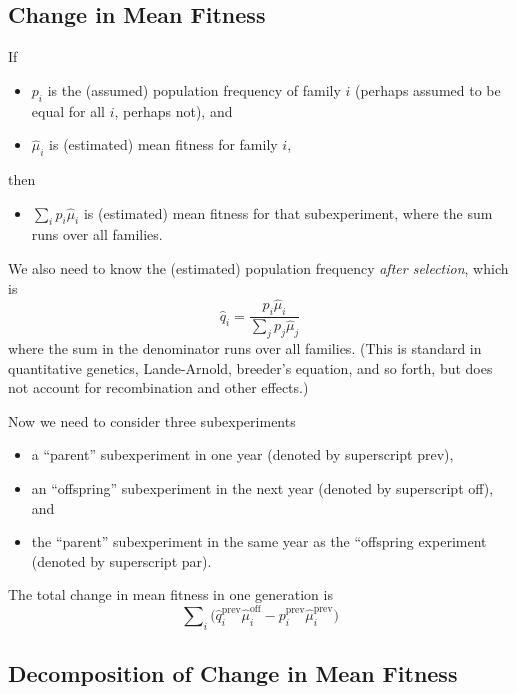 \documentclass[11pt]{article}
\begin{document}
\subsection{Change in Mean Fitness}

If
\begin{itemize}
\item $p_i$ is the (assumed) population frequency of family $i$ (perhaps
    assumed to be equal for all $i$, perhaps not), and
\item $\hat{\mu}_i$ is (estimated) mean fitness for family $i$,
\end{itemize}
then
\begin{itemize}
\item $\sum_i p_i \hat{\mu}_i$ is (estimated) mean fitness for
that subexperiment, where the sum runs over all families.
\end{itemize}

We also need to know the (estimated) population frequency
\emph{after selection}, which is
$$
   \hat{q}_i = \frac{p_i \hat{\mu}_i}{\sum_j p_j \hat{\mu}_j}
$$
where the sum in the denominator runs over all families.
(This is standard in quantitative genetics, Lande-Arnold, breeder's equation,
and so forth, but does not account for recombination and other effects.)

Now we need to consider three subexperiments
\begin{itemize}
\item a ``parent'' subexperiment in one year (denoted by superscript prev),
\item an ``offspring'' subexperiment in the next year (denoted
    by superscript off), and
\item the ``parent'' subexperiment in the same year as the ``offspring
    experiment (denoted by superscript par).
\end{itemize}

The total change in mean fitness in one generation is
\begin{equation} \label{eq:total-change}
   \sum\nolimits_i \bigl(
   \hat{q}_i^\text{prev} \hat{\mu}_i^\text{off}
   -
   p_i^\text{prev} \hat{\mu}_i^\text{prev}
   \bigr)
\end{equation}

\subsection{Decomposition of Change in Mean Fitness}
\end{document}
